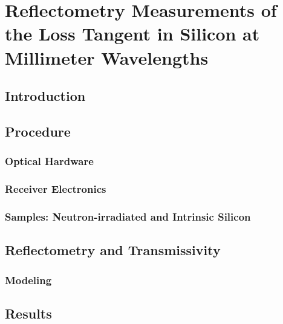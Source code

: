 \chapter{Reflectometry Measurements of the Loss Tangent in Silicon at Millimeter Wavelengths}
\section{Introduction}
\section{Procedure}
\subsection{Optical Hardware}
\subsection{Receiver Electronics}
\subsection{Samples: Neutron-irradiated and Intrinsic Silicon}
\section{Reflectometry and Transmissivity}
\subsection{Modeling}
\section{Results}
